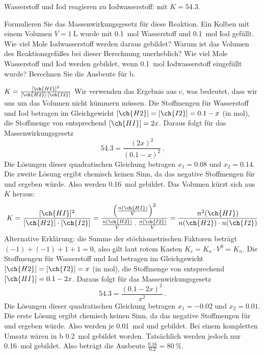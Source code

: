 \documentclass[DIV11]{scrartcl}
\begin{document}
\begin{question}[name=Iodwasserstoffgleichgewicht,ID=HI-Glgw]
Wasserstoff und Iod reagieren zu Iodwasserstoff:  mit $K = 54.3$.
\begin{tasks}
 \task Formulieren Sie das Massenwirkungsgesetz für diese Reaktion.
 \task Ein Kolben mit einem Volumen $V = \SI{1}{\liter}$ wurde mit \SI{0.1}{\mole}
   Wasserstoff und \SI{0.1}{\mole} Iod gefüllt.  Wie viel Mole Iodwasserstoff werden
   daraus gebildet?
 \task Warum ist das Volumen des Reaktionsgefäßes bei dieser Berechnung unerheblich?
 \task Wie viel Mole Wasserstoff und Iod werden gebildet, wenn \SI{0.1}{\mole}
   Iodwasserstoff eingefüllt wurde?
 \task Berechnen Sie die Ausbeute für b.
\end{tasks}
\end{question}
\begin{solution}
\begin{tasks}
 \task $K = \frac{[\ch{HI}]^2}{[\ch{H2}]\cdot[\ch{I2}]}$
 \task Wir verwenden das Ergebnis aus c, was bedeutet, dass wir uns um das
   Volumen nicht kümmern müssen.  Die Stoffmengen für Wasserstoff und Iod
   betragen im Gleichgewicht $[\ch{H2}]=[\ch{I2}]=0.1-x$ (in \si{\mole}), die
   Stoffmenge von  entsprechend $[\ch{HI}]=2x$.  Daraus folgt für das
   Massenwirkungsgesetz \[54.3 = \frac{(2x)^2}{(0.1-x)^2} \,.\]  Die Lösungen
   dieser quadratischen Gleichung betragen $x_1=0.08$ und $x_2=0.14$.  Die
   zweite Lösung ergibt chemisch keinen Sinn, da das negative Stoffmengen
   für  und  ergeben würde.  Also werden \SI{0.16}{\mole} 
   gebildet.
 \task Das Volumen kürzt sich aus $K$ heraus:
   \[
     K = \frac{[\ch{HI}]^2}{[\ch{H2}]\cdot[\ch{I2}]}
       = \frac{\left(\frac{n(\ch{HI})}{V}\right)^2}{\frac{n(\ch{H2})}{V}\cdot\frac{n(\ch{I2})}{V}}
       = \frac{n^2(\ch{HI})}{n(\ch{H2})\cdot n(\ch{I2})}
   \]
   Alternative Erklärung: die Summe der stöchiometrischen Faktoren beträgt
   $(-1) + (-1) +1 +1 = 0$, also gilt laut rotem Kasten $K_c = K_n \cdot V^0 =
   K_n$.
 \task Die Stoffmengen für Wasserstoff und Iod  betragen im Gleichgewicht
   $[\ch{H2}]=[\ch{I2}]=x$ (in \si{\mole}), die Stoffmenge von 
   entsprechend $[\ch{HI}]=0.1-2x$.  Daraus folgt für das Massenwirkungsgesetz
   \[54.3 = \frac{(0.1-2x)^2}{x^2} \,.\]  Die Lösungen
   dieser quadratischen Gleichung betragen $x_1=-0.02$ und $x_2=0.01$.  Die
   erste Lösung ergibt chemisch keinen Sinn, da das negative Stoffmengen
   für  und  ergeben würde.  Also werden je \SI{0.01}{\mole}
    und  gebildet.
 \task Bei einem kompletten Umsatz wären in b \SI{0.2}{\mole} 
   gebildet worden.  Tatsächlich werden jedoch nur \SI{0.16}{\mole}
   gebildet.  Also beträgt die Ausbeute $\frac{0.16}{0.2}=\SI{80}{\percent}$.
\end{tasks}
\end{solution}
\end{document}
